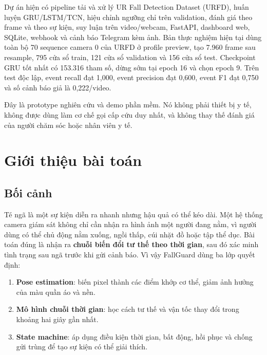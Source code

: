 \documentclass[12pt,a4paper,oneside]{report}
\begin{document}
Dự án hiện có pipeline tải và xử lý UR Fall Detection Dataset (URFD), huấn luyện
GRU/LSTM/TCN, hiệu chỉnh ngưỡng chỉ trên validation, đánh giá theo frame và theo
sự kiện, suy luận trên video/webcam, FastAPI, dashboard web, SQLite, webhook và
cảnh báo Telegram kèm ảnh. Bản thực nghiệm hiện tại dùng toàn bộ 70 sequence
camera 0 của URFD ở profile preview, tạo 7.960 frame sau resample, 795 cửa sổ
train, 121 cửa sổ validation và 156 cửa sổ test. Checkpoint GRU tốt nhất có
153.316 tham số, dừng sớm tại epoch 16 và chọn epoch 9. Trên test độc lập, event
recall đạt 1,000, event precision đạt 0,600, event F1 đạt 0,750 và số cảnh báo
giả là 0,222/video.

\begin{warningbox}
Đây là prototype nghiên cứu và demo phần mềm. Nó không phải thiết bị y tế, không
được dùng làm cơ chế gọi cấp cứu duy nhất, và không thay thế đánh giá của người
chăm sóc hoặc nhân viên y tế.
\end{warningbox}

\tableofcontents
\listoffigures
\listoftables
\clearpage
{}

\chapter{Giới thiệu bài toán}

\section{Bối cảnh}

Té ngã là một sự kiện diễn ra nhanh nhưng hậu quả có thể kéo dài. Một hệ thống
camera giám sát không chỉ cần nhận ra hình ảnh một người đang nằm, vì người dùng
có thể chủ động nằm xuống, ngồi thấp, cúi nhặt đồ hoặc tập thể dục. Bài toán đúng
là nhận ra \textbf{chuỗi biến đổi tư thế theo thời gian}, sau đó xác minh tình
trạng sau ngã trước khi gửi cảnh báo. Vì vậy FallGuard dùng ba lớp quyết định:

\begin{enumerate}[label=\arabic*.]
  \item \textbf{Pose estimation}: biến pixel thành các điểm khớp cơ thể, giảm
  ảnh hưởng của màu quần áo và nền.
  \item \textbf{Mô hình chuỗi thời gian}: học cách tư thế và vận tốc thay đổi
  trong khoảng hai giây gần nhất.
  \item \textbf{State machine}: áp dụng điều kiện thời gian, bất động, hồi phục
  và chống gửi trùng để tạo sự kiện có thể giải thích.
\end{enumerate}
\end{document}
